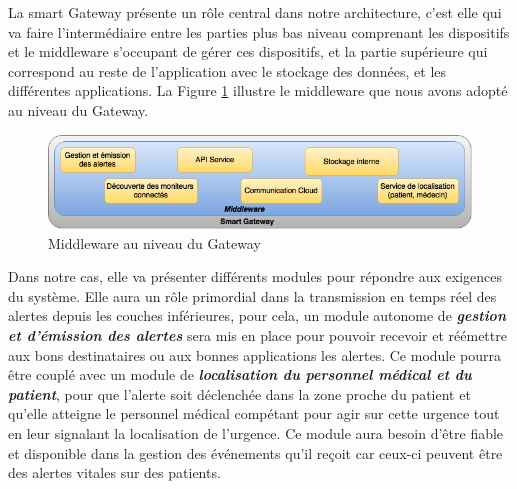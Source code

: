 La smart Gateway présente un rôle central dans notre architecture, c’est elle qui va faire l’intermédiaire entre les parties plus bas niveau comprenant les dispositifs et le middleware s’occupant de gérer ces dispositifs, et la partie supérieure qui correspond au reste de l’application avec le stockage des données, et les différentes applications. La Figure \ref{gateway} illustre le middleware que nous avons adopté au niveau du Gateway.
\newline
\begin{figure}[h!]
	\hspace*{-3cm}
	\centering
	\includegraphics[width=1.5\textwidth]{Figure6.png}
	\caption{Middleware au niveau du Gateway}
	\label{gateway}
\end{figure}

Dans notre cas, elle va présenter différents modules pour répondre aux exigences du système. Elle aura un rôle primordial dans la transmission en temps réel des alertes depuis les couches inférieures, pour cela, un module autonome de \textbf{\textit{gestion et d’émission des alertes}} sera mis en place pour pouvoir recevoir et réémettre aux bons destinataires ou aux bonnes applications les alertes. Ce module pourra être couplé avec un module de \textbf{\textit{localisation du personnel médical et du patient}}, pour que l’alerte soit déclenchée dans la zone proche du patient et qu’elle atteigne le personnel médical compétant pour agir sur cette urgence tout en leur signalant la localisation de l’urgence. Ce module aura besoin d’être fiable et disponible dans la gestion des événements qu’il reçoit car ceux-ci peuvent être des alertes vitales sur des patients.

